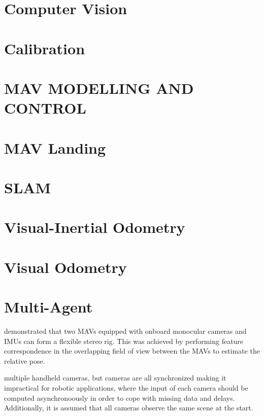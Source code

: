 \documentclass{article}
\begin{document}
\section{Computer Vision}



\section{Calibration}



\section{MAV MODELLING AND CONTROL}



\section{MAV Landing}



\section{SLAM}



\section{Visual-Inertial Odometry}



\section{Visual Odometry}



\section{Multi-Agent}

\cite{achtelik2011collaborative} demonstrated that two MAVs equipped with
onboard monocular cameras and IMUs can form a flexible stereo rig. This was
achieved by performing feature correspondence in the overlapping field of view
between the MAVs to estimate the relative pose.

\cite{zou2013coslam} multiple handheld cameras, but cameras are all
synchronized making it impractical for robotic applications, where the input of
each camera should be computed asynchronoously in order to cope with missing
data and delays. Additionally, it is assumed that all cameras observe the same
scene at the start.
\end{document}
